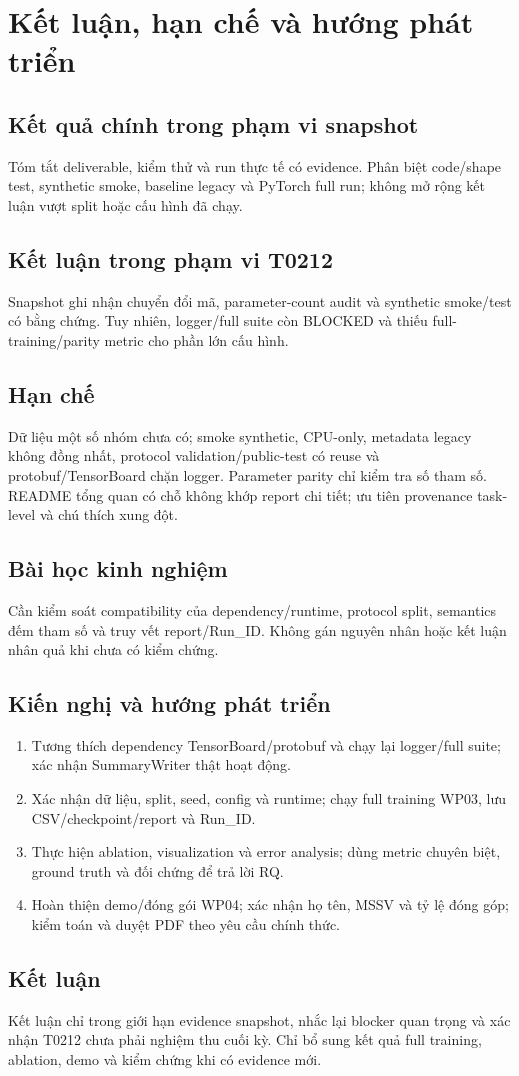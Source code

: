 \chapter{Kết luận, hạn chế và hướng phát triển}
\section{Kết quả chính trong phạm vi snapshot}
Tóm tắt deliverable, kiểm thử và run thực tế có evidence. Phân biệt code/shape test, synthetic smoke, baseline legacy và PyTorch full run; không mở rộng kết luận vượt split hoặc cấu hình đã chạy.

\section{Kết luận trong phạm vi T0212}
Snapshot ghi nhận chuyển đổi mã, parameter-count audit và synthetic smoke/test có bằng chứng. Tuy nhiên, logger/full suite còn BLOCKED và thiếu full-training/parity metric cho phần lớn cấu hình.

\section{Hạn chế}
Dữ liệu một số nhóm chưa có; smoke synthetic, CPU-only, metadata legacy không đồng nhất, protocol validation/public-test có reuse và protobuf/TensorBoard chặn logger. Parameter parity chỉ kiểm tra số tham số. README tổng quan có chỗ không khớp report chi tiết; ưu tiên provenance task-level và chú thích xung đột.

\section{Bài học kinh nghiệm}
Cần kiểm soát compatibility của dependency/runtime, protocol split, semantics đếm tham số và truy vết report/Run_ID. Không gán nguyên nhân hoặc kết luận nhân quả khi chưa có kiểm chứng.

\section{Kiến nghị và hướng phát triển}
\begin{enumerate}
\item Tương thích dependency TensorBoard/protobuf và chạy lại logger/full suite; xác nhận SummaryWriter thật hoạt động.
\item Xác nhận dữ liệu, split, seed, config và runtime; chạy full training WP03, lưu CSV/checkpoint/report và Run_ID.
\item Thực hiện ablation, visualization và error analysis; dùng metric chuyên biệt, ground truth và đối chứng để trả lời RQ.
\item Hoàn thiện demo/đóng gói WP04; xác nhận họ tên, MSSV và tỷ lệ đóng góp; kiểm toán và duyệt PDF theo yêu cầu chính thức.
\end{enumerate}

\section{Kết luận}
Kết luận chỉ trong giới hạn evidence snapshot, nhắc lại blocker quan trọng và xác nhận T0212 chưa phải nghiệm thu cuối kỳ. Chỉ bổ sung kết quả full training, ablation, demo và kiểm chứng khi có evidence mới.